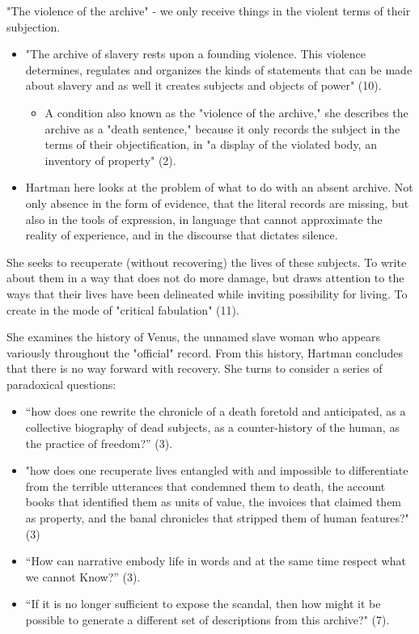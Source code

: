 \documentclass[11pt]{article}
\begin{document}
"The violence of the archive" - we only receive things in the violent
terms of their subjection. 
\begin{itemize}
\item "The archive of slavery rests upon a founding violence. This
violence determines, regulates and organizes the kinds of statements
that can be made about slavery and as well it creates subjects and
objects of power" (10).
\begin{itemize}
\item A condition also known as the "violence of the archive," she
describes the archive as a "death sentence," because it only
records the subject in the terms of their objectification, in "a
display of the violated body, an inventory of property" (2).
\end{itemize}
\item Hartman here looks at the problem of what to do with an absent
archive. Not only absence in the form of evidence, that the literal
records are missing, but also in the tools of expression, in
language that cannot approximate the reality of experience, and in
the discourse that dictates silence.
\end{itemize}

She seeks to recuperate (without recovering) the lives of these
subjects. To write about them in a way that does not do more damage,
but draws attention to the ways that their lives have been delineated
while inviting possibility for living. To create in the mode of
"critical fabulation" (11).

She examines the history of Venus, the unnamed slave woman who appears
variously throughout the "official" record. From this history, Hartman
concludes that there is no way forward with recovery. She turns to
consider a series of paradoxical questions:
\begin{itemize}
\item “how does one rewrite the chronicle of a death foretold and
anticipated, as a collective biography of dead subjects, as a
counter-history of the human, as the practice of freedom?” (3).
\item "how does one recuperate lives entangled with and impossible to
differentiate from the terrible utterances that condemned them to
death, the account books that identified them as units of value, the
invoices that claimed them as property, and the banal chronicles
that stripped them of human features?" (3)
\item “How can narrative embody life in words and at the same time respect
what we cannot Know?” (3).
\item “If it is no longer sufficient to expose the scandal, then how might
it be possible to generate a different set of descriptions from this
archive?" (7).
\end{itemize}
\end{document}
